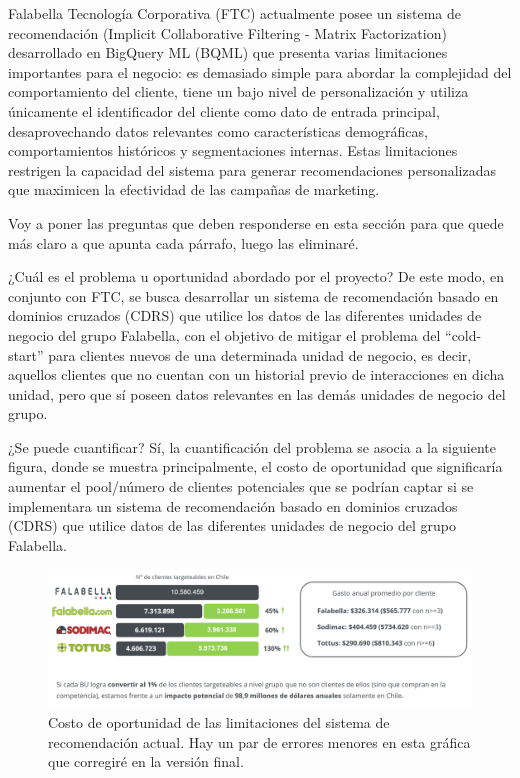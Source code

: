 \newpage

Falabella Tecnología Corporativa (FTC) actualmente posee un sistema de recomendación (Implicit Collaborative Filtering - Matrix Factorization) desarrollado en BigQuery ML (BQML) que presenta varias limitaciones importantes para el negocio: es demasiado simple para abordar la complejidad del comportamiento del cliente, tiene un bajo nivel de personalización y utiliza únicamente el identificador del cliente como dato de entrada principal, desaprovechando datos relevantes como características demográficas, comportamientos históricos y segmentaciones internas. Estas limitaciones restrigen la capacidad del sistema para generar recomendaciones personalizadas que maximicen la efectividad de las campañas de marketing.

Voy a poner las preguntas que deben responderse en esta sección para que quede más claro a que apunta cada párrafo, luego las eliminaré.

¿Cuál es el problema u oportunidad abordado por el proyecto?
De este modo, en conjunto con FTC, se busca desarrollar un sistema de recomendación basado en dominios cruzados (CDRS) que utilice los datos de las diferentes unidades de negocio del grupo Falabella, con el objetivo de mitigar el problema del \enquote{cold-start} para clientes nuevos de una determinada unidad de negocio, es decir, aquellos clientes que no cuentan con un historial previo de interacciones en dicha unidad, pero que sí poseen datos relevantes en las demás unidades de negocio del grupo. 

¿Se puede cuantificar?
Sí, la cuantificación del problema se asocia a la siguiente figura, donde se muestra principalmente, el costo de oportunidad que significaría aumentar el pool/número de clientes potenciales que se podrían captar si se implementara un sistema de recomendación basado en dominios cruzados (CDRS) que utilice datos de las diferentes unidades de negocio del grupo Falabella.

\begin{figure}[th]
	\centering
	\includegraphics[width=\textwidth]{Figures/grafica Matias.png}
	\caption{Costo de oportunidad de las limitaciones del sistema de recomendación actual. Hay un par de errores menores en esta gráfica que corregiré en la versión final.}
	\label{fig:Limitaciones_Sistema_Actual}
\end{figure}

